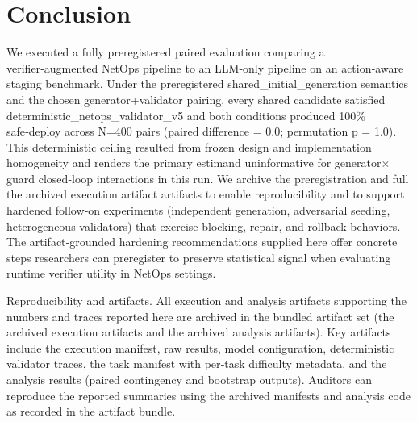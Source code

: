 \documentclass[conference]{IEEEtran}
\begin{document}
\section{Conclusion}
We executed a fully preregistered paired evaluation comparing a verifier‑augmented NetOps pipeline to an LLM‑only pipeline on an action‑aware staging benchmark. Under the preregistered shared\_initial\_generation semantics and the chosen generator+validator pairing, every shared candidate satisfied deterministic\_netops\_validator\_v5 and both conditions produced 100\% safe‑deploy across N=400 pairs (paired difference = 0.0; permutation p = 1.0). This deterministic ceiling resulted from frozen design and implementation homogeneity and renders the primary estimand uninformative for generator\ensuremath{\times}guard closed‑loop interactions in this run. We archive the preregistration and full the archived execution artifact artifacts to enable reproducibility and to support hardened follow‑on experiments (independent generation, adversarial seeding, heterogeneous validators) that exercise blocking, repair, and rollback behaviors. The artifact‑grounded hardening recommendations supplied here offer concrete steps researchers can preregister to preserve statistical signal when evaluating runtime verifier utility in NetOps settings.

Reproducibility and artifacts. All execution and analysis artifacts supporting the numbers and traces reported here are archived in the bundled artifact set (the archived execution artifacts and the archived analysis artifacts). Key artifacts include the execution manifest, raw results, model configuration, deterministic validator traces, the task manifest with per‑task difficulty metadata, and the analysis results (paired contingency and bootstrap outputs). Auditors can reproduce the reported summaries using the archived manifests and analysis code as recorded in the artifact bundle.
\end{document}
